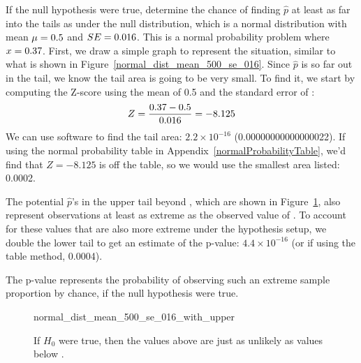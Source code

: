 \begin{examplewrap}
\begin{nexample}{If the null hypothesis were true,
    determine the chance of finding $\hat{p}$ at least
    as far into the tails as \pewcoalpollprop{}
    under the null distribution,
    which is a normal distribution with mean
    $\mu = 0.5{}$
    and $SE = 0.016{}$.}
%
  This is a normal probability problem where
  $x = 0.37{}$.
  First, we draw a simple graph to represent the situation,
  similar to what is shown in
  Figure~\ref{normal_dist_mean_500_se_016}.
  Since $\hat{p}$ is so far out in the tail, we know the
  tail area is going to be very small. To find it, we start
  by computing the Z-score using the mean of 0.5 and the
  standard error of \pewcoalpollnullse{}:
  \begin{align*}
  Z = \frac{0.37{} - 0.5}{0.016{}} = -8.125 
  \end{align*}
  We can use software to find the tail area:
  $2.2 \times 10^{-16}$
  (0.00000000000000022).
  If using the normal probability table in
  Appendix~\ref{normalProbabilityTable},
  we'd find that $Z = -8.125$ is off the table,
  so we would use the smallest area listed: 0.0002.

  The potential $\hat{p}$'s in the upper tail beyond
  \pewcoalpollpropcomplement{}, which are shown
  in Figure~\ref{normal_dist_mean_500_se_016_with_upper},
  also represent observations at least as extreme as
  the observed value of \pewcoalpollprop{}.
  To account for these values that are also more
  extreme under the hypothesis setup,
  we double the lower tail to get an estimate
  of the p-value: $4.4 \times 10^{-16}$
  (or if using the table method, 0.0004).

  The p-value represents the probability of observing
  such an extreme sample proportion by chance, if the null
  hypothesis were true.
\end{nexample}
\end{examplewrap}

\begin{figure}[h]
  \centering
      {normal_dist_mean_500_se_016_with_upper}
  \caption{
      If $H_0$ were true, then the values above
      \pewcoalpollpropcomplement{} are just
      as unlikely as values below \pewcoalpollprop{}.}
  \label{normal_dist_mean_500_se_016_with_upper}
\end{figure}




